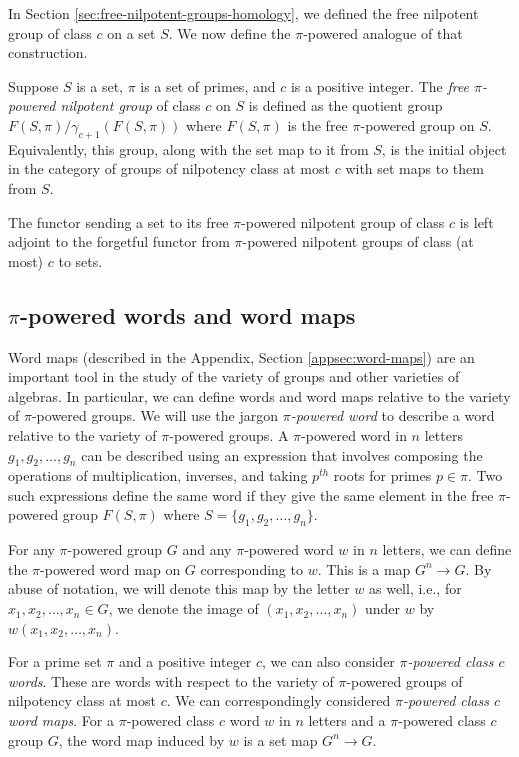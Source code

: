 \documentclass{ucetd}
\begin{document}
In Section \ref{sec:free-nilpotent-groups-homology}, we defined the free
nilpotent group of class $c$ on a set $S$. We now define the
$\pi$-powered analogue of that construction.

\begin{definer}
  Suppose $S$ is a set, $\pi$ is a set of primes, and $c$ is a
  positive integer. The {\em free $\pi$-powered nilpotent group} of
  class $c$ on $S$ is defined as the quotient group
  $F(S,\pi)/\gamma_{c+1}(F(S,\pi))$ where $F(S,\pi)$ is the free
  $\pi$-powered group on $S$. Equivalently, this group, along with the
  set map to it from $S$, is the initial object in the category of
  groups of nilpotency class at most $c$ with set maps to them from
  $S$.

  The functor sending a set to its free $\pi$-powered nilpotent group
  of class $c$ is left adjoint to the forgetful functor from
  $\pi$-powered nilpotent groups of class (at most) $c$ to sets.
\end{definer}

\subsection{$\pi$-powered words and word maps}\label{sec:pi-powered-word-maps}

Word maps (described in the Appendix, Section \ref{appsec:word-maps})
are an important tool in the study of the variety of groups and other
varieties of algebras. In particular, we can define words and word
maps relative to the variety of $\pi$-powered groups. We will use the
jargon {\em $\pi$-powered word} to describe a word relative to the
variety of $\pi$-powered groups. A $\pi$-powered word in $n$ letters
$g_1,g_2,\dots,g_n$ can be described using an expression that involves
composing the operations of multiplication, inverses, and taking
$p^{th}$ roots for primes $p \in \pi$. Two such expressions define the
same word if they give the same element in the free $\pi$-powered
group $F(S,\pi)$ where $S = \{ g_1,g_2,\dots,g_n \}$.

For any $\pi$-powered group $G$ and any $\pi$-powered word $w$ in $n$
letters, we can define the $\pi$-powered word map on $G$ corresponding
to $w$. This is a map $G^n \to G$. By abuse of notation, we will
denote this map by the letter $w$ as well, i.e., for
$x_1,x_2,\dots,x_n \in G$, we denote the image of
$(x_1,x_2,\dots,x_n)$ under $w$ by $w(x_1,x_2,\dots,x_n)$.

For a prime set $\pi$ and a positive integer $c$, we can also consider
{\em $\pi$-powered class $c$ words}. These are words with respect to
the variety of $\pi$-powered groups of nilpotency class at most
$c$. We can correspondingly considered {\em $\pi$-powered class $c$
  word maps}. For a $\pi$-powered class $c$ word $w$ in $n$ letters
and a $\pi$-powered class $c$ group $G$, the word map induced by $w$
is a set map $G^n \to G$.
\end{document}
